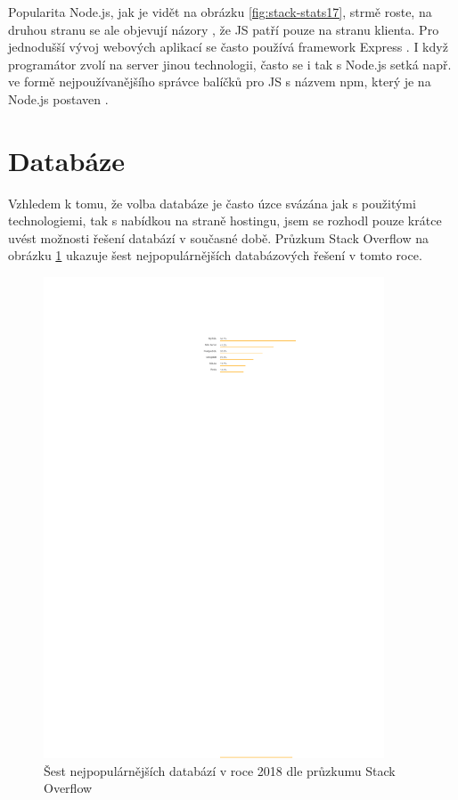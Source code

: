         Popularita Node.js, jak je vidět na obrázku \ref{fig:stack-stats17}, strmě roste, na druhou stranu se ale objevují názory \cite{tech-node1}, že JS patří pouze na stranu klienta. Pro jednodušší vývoj webových aplikací se často používá framework Express \cite{tech-node2}. I když programátor zvolí na server jinou technologii, často se i tak s Node.js setká např. ve formě nejpoužívanějšího správce balíčků pro JS s názvem npm, který je na Node.js postaven \cite{tech1}.


    \section{Databáze}
    Vzhledem k tomu, že volba databáze je často úzce svázána jak s použitými technologiemi, tak s nabídkou na straně hostingu, jsem se rozhodl pouze krátce uvést možnosti řešení databází v současné době. Průzkum Stack Overflow \cite{stack-stats18} na obrázku \ref{fig:stack-stats18-db} ukazuje šest nejpopulárnějších databázových řešení v tomto roce.
    
    \begin{figure}\centering
    	\includegraphics[width=0.9\textwidth]{img/stack-stats-db}
    	\caption[Popularita databází v roce 2018 dle průzkumu Stack Overflow]{Šest nejpopulárnějších databází v roce 2018 dle průzkumu Stack Overflow \cite{stack-stats18}}\label{fig:stack-stats18-db}
    \end{figure}
    
